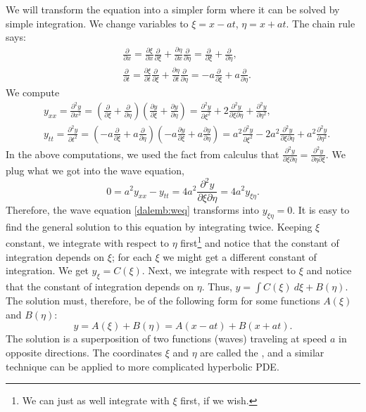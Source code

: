 \documentclass[12pt]{book}
\begin{document}
We will transform the equation into a simpler form where it can be solved by
simple integration.
We change variables to $\xi = x - at$, $\eta = x + at$.
The chain rule says:
\begin{align*}
& \frac{\partial}{\partial x}
=
\frac{\partial \xi}{\partial x}
\frac{\partial}{\partial \xi}
+
\frac{\partial \eta}{\partial x}
\frac{\partial}{\partial \eta}
=
\frac{\partial}{\partial \xi}
+
\frac{\partial}{\partial \eta} , \\
& \frac{\partial}{\partial t}
=
\frac{\partial \xi}{\partial t}
\frac{\partial}{\partial \xi}
+
\frac{\partial \eta}{\partial t}
\frac{\partial}{\partial \eta}
=
-a
\frac{\partial}{\partial \xi}
+
a
\frac{\partial}{\partial \eta} .
\end{align*}
We compute
\begin{align*}
& y_{xx} = \frac{\partial^2 y}{\partial x^2}
=
\left(
\frac{\partial}{\partial \xi}
+
\frac{\partial}{\partial \eta}
\right)
\left(
\frac{\partial y}{\partial \xi}
+
\frac{\partial y}{\partial \eta}
\right)
=
\frac{\partial^2 y}{\partial \xi^2}
+
2 \frac{\partial^2 y}{\partial \xi \partial \eta}
+
\frac{\partial^2 y}{\partial \eta^2} ,
\\
& y_{tt} = \frac{\partial^2 y}{\partial t^2}
=
\left(
-a
\frac{\partial}{\partial \xi}
+ a
\frac{\partial}{\partial \eta}
\right)
\left(
-a
\frac{\partial y}{\partial \xi}
+
a
\frac{\partial y}{\partial \eta}
\right)
=
a^2
\frac{\partial^2 y}{\partial \xi^2}
-
2 a^2 \frac{\partial^2 y}{\partial \xi \partial \eta}
+
a^2
\frac{\partial^2 y}{\partial \eta^2} .
\end{align*}
In the above computations, we used the fact from calculus that
$\frac{\partial^2 y}{\partial \xi \partial \eta} = 
\frac{\partial^2 y}{\partial \eta \partial \xi}$.
We plug what we got into the wave equation,
\begin{equation*}
0 = a^2 y_{xx} - y_{tt} =
4 a^2 \frac{\partial^2 y}{\partial \xi \partial \eta} = 4 a^2 y_{\xi\eta} .
\end{equation*}
Therefore, the wave equation \eqref{dalemb:weq} transforms into
$y_{\xi\eta} = 0$.
It is easy to find the general solution to this equation by integrating
twice.  Keeping $\xi$ constant, we integrate with respect to $\eta$
first\footnote{We can just as well integrate with $\xi$ first, if we wish.}
and notice that
the constant of integration depends on $\xi$; for each $\xi$ we might get a
different constant of integration.  We get
$y_{\xi} = C(\xi)$.
Next, we integrate with respect to $\xi$ and notice that the constant of
integration depends on $\eta$.
Thus,
$y = \int C(\xi) ~ d\xi + B(\eta)$.
The solution must, therefore, be of the following form for some functions
$A(\xi)$ and $B(\eta)$:
\begin{equation*}
y = A(\xi) + B(\eta) = A(x-at) + B(x+at) .
\end{equation*}
The solution is a superposition of two functions (waves) traveling at speed
$a$
in opposite directions.  The coordinates $\xi$ and $\eta$ are called the
\emph{}, and a similar technique can
be applied to more complicated hyperbolic PDE.
\end{document}
